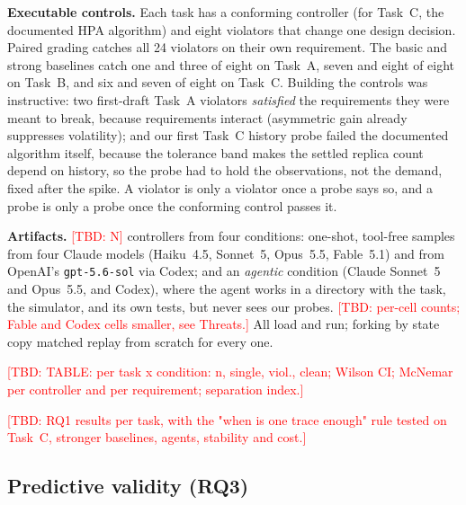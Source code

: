 \documentclass[sigconf,review,anonymous]{acmart}
\newcommand{\tbd}[1]{\textcolor{red}{[TBD: #1]}}
\begin{document}
	\textbf{Executable controls.} Each task has a conforming controller (for
	Task~C, the documented HPA algorithm) and eight violators that change one
	design decision. Paired grading catches all 24 violators on their own
	requirement. The basic and strong baselines catch one and three of eight
	on Task~A, seven and eight of eight on Task~B, and six and seven of
	eight on Task~C. Building the controls was instructive: two first-draft
	Task~A violators \emph{satisfied} the requirements they were meant to
	break, because requirements interact (asymmetric gain already suppresses
	volatility); and our first Task~C history probe failed the documented
	algorithm itself, because the tolerance band makes the settled replica
	count depend on history, so the probe had to hold the observations, not
	the demand, fixed after the spike. A violator is only a violator once a
	probe says so, and a probe is only a probe once the conforming control
	passes it.

	\textbf{Artifacts.} \tbd{N} controllers from four conditions: one-shot,
	tool-free samples from four Claude models (Haiku~4.5, Sonnet~5,
	Opus~5.5, Fable~5.1) and from OpenAI's \texttt{gpt-5.6-sol} via Codex;
	and an \emph{agentic} condition (Claude Sonnet~5 and Opus~5.5, and
	Codex), where the agent works in a directory with the task, the
	simulator, and its own tests, but never sees our probes. \tbd{per-cell
	counts; Fable and Codex cells smaller, see Threats.} All load and run;
	forking by state copy matched replay from scratch for every one.

	\tbd{TABLE: per task x condition: n, single, viol., clean; Wilson CI;
	McNemar per controller and per requirement; separation index.}

	\tbd{RQ1 results per task, with the "when is one trace enough" rule
	tested on Task~C, stronger baselines, agents, stability and cost.}

	\subsection{Predictive validity (RQ3)}
	\label{sec:rq3}
\end{document}
